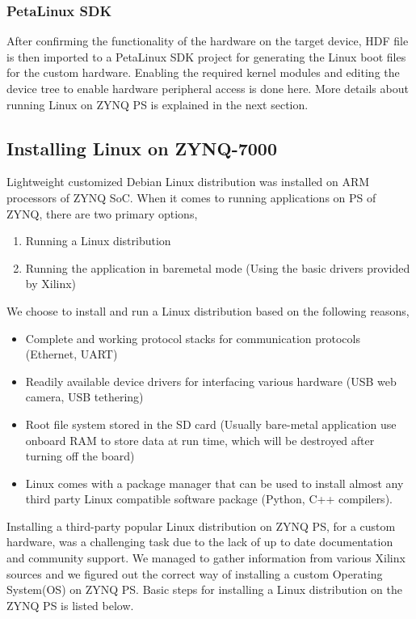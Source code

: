\documentclass[12pt,a4paper]{report}
\begin{document}
\subsubsection{PetaLinux SDK}
After confirming the functionality of the hardware on the target device, HDF file is then imported to a PetaLinux SDK project for generating the Linux boot files for the custom hardware. Enabling the required kernel modules and editing the device tree to enable hardware peripheral access is done here. More details about running Linux on ZYNQ PS is explained in the next section.

\subsection{Installing Linux on ZYNQ-7000}
Lightweight customized Debian Linux distribution was installed on ARM processors of ZYNQ SoC. When it comes to running applications on PS of ZYNQ, there are two primary options,

\begin{enumerate}
\item Running a Linux distribution 
\item Running the application in baremetal mode (Using the basic drivers provided by Xilinx)
\end{enumerate}

\noindent We choose to install and run a Linux distribution based on the following reasons,
\begin{itemize}
\item Complete and working protocol stacks for communication protocols (Ethernet, UART)
\item Readily available device drivers for interfacing various hardware (USB web camera, USB tethering)
\item Root file system stored in the SD card (Usually bare-metal application use onboard RAM to store data at run time, which will be destroyed after turning off the board)
\item Linux comes with a package manager that can be used to install almost any third party Linux compatible software package (Python, C++ compilers).
\end{itemize}

Installing a third-party popular Linux distribution on ZYNQ PS, for a custom hardware, was a challenging task due to the lack of up to date documentation and community support.  We managed to gather information from various Xilinx sources and we figured out the correct way of installing a custom Operating System(OS) on ZYNQ PS. Basic steps for installing a Linux distribution on the ZYNQ PS is listed below.
\end{document}
